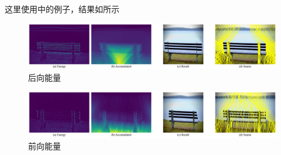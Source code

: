 \documentclass[twoside,a4paper,4pt]{article}
\begin{document}
这里使用\cite{rubinstein2008improved}中的例子，结果如所示
\begin{figure}[H]
    \centering
    \includegraphics[width=\linewidth]{demo/output/backward_energy.png}
    \vspace{-30pt}\caption{后向能量}
    \label{fig:bw_energy}
\end{figure}\par
\begin{figure}[H]
    \centering
    \includegraphics[width=\linewidth]{demo/output/forward_energy.png}
    \vspace{-30pt}\caption{前向能量}
    \label{fig:fw_energy}
\end{figure}
\end{document}

